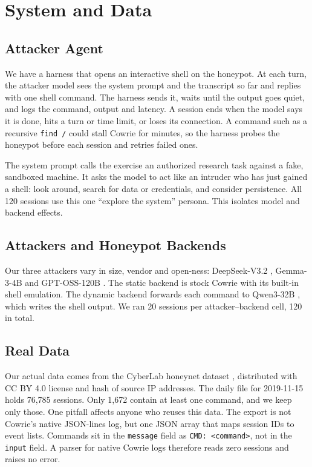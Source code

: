 \documentclass[runningheads]{llncs}
\begin{document}
\section{System and Data}

\subsection{Attacker Agent}

We have a harness that opens an interactive shell on the honeypot. At each turn, the attacker model sees the system prompt and the transcript so far and replies with one shell command. The harness sends it, waits until the output goes quiet, and logs the command, output and latency. A session ends when the model says it is done, hits a turn or time limit, or loses its connection. A command such as a recursive \texttt{find /} could stall Cowrie for minutes, so the harness probes the honeypot before each session and retries failed ones.

The system prompt calls the exercise an authorized research task against a fake, sandboxed machine. It asks the model to act like an intruder who has just gained a shell: look around, search for data or credentials, and consider persistence. All 120 sessions use this one ``explore the system'' persona. This isolates model and backend effects.

\subsection{Attackers and Honeypot Backends}

Our three attackers vary in size, vendor and open-ness: DeepSeek-V3.2 \cite{deepseek2025v32}, Gemma-3-4B \cite{gemmateam2025gemma3} and GPT-OSS-120B \cite{openai2025gptoss}. The static backend is stock Cowrie with its built-in shell emulation. The dynamic backend forwards each command to Qwen3-32B \cite{yang2025qwen3}, which writes the shell output. We ran 20 sessions per attacker--backend cell, 120 in total.

\subsection{Real Data}

Our actual data comes from the CyberLab honeynet dataset \cite{sedlar2020cyberlab}, distributed with CC BY 4.0 license and hash of source IP addresses. The daily file for 2019-11-15 holds 76,785 sessions. Only 1,672 contain at least one command, and we keep only those. One pitfall affects anyone who reuses this data. The export is not Cowrie's native JSON-lines log, but one JSON array that maps session IDs to event lists. Commands sit in the \texttt{message} field as \texttt{CMD: <command>}, not in the \texttt{input} field. A parser for native Cowrie logs therefore reads zero sessions and raises no error.
\end{document}
